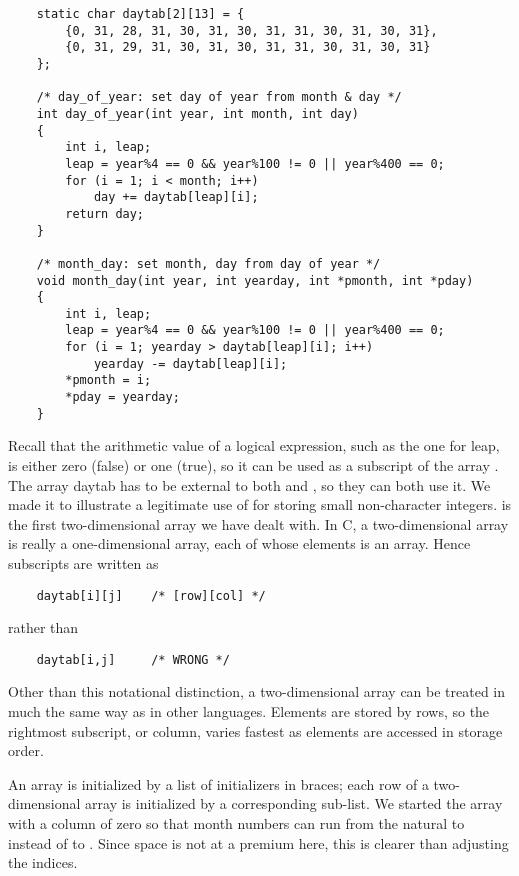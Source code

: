 \begin{lstlisting}
    static char daytab[2][13] = {
        {0, 31, 28, 31, 30, 31, 30, 31, 31, 30, 31, 30, 31},
        {0, 31, 29, 31, 30, 31, 30, 31, 31, 30, 31, 30, 31}
    };

    /* day_of_year: set day of year from month & day */
    int day_of_year(int year, int month, int day)
    {
        int i, leap;
        leap = year%4 == 0 && year%100 != 0 || year%400 == 0;
        for (i = 1; i < month; i++)
            day += daytab[leap][i];
        return day;
    }

    /* month_day: set month, day from day of year */
    void month_day(int year, int yearday, int *pmonth, int *pday)
    {
        int i, leap;
        leap = year%4 == 0 && year%100 != 0 || year%400 == 0;
        for (i = 1; yearday > daytab[leap][i]; i++)
            yearday -= daytab[leap][i];
        *pmonth = i;
        *pday = yearday;
    }
\end{lstlisting}

Recall that the arithmetic value of a logical expression, such as the one for leap, is either zero (false) or one (true), so it can be used as a subscript of the array .
The array daytab has to be external to both  and , so they can both use it.
We made it  to illustrate a legitimate use of  for storing small non-character integers.
 is the first two-dimensional array we have dealt with. In C, a two-dimensional array is really a one-dimensional array, each of whose elements is an array.
Hence subscripts are written as
\begin{lstlisting}
    daytab[i][j]    /* [row][col] */
\end{lstlisting}
rather than
\begin{lstlisting}
    daytab[i,j]     /* WRONG */
\end{lstlisting}
Other than this notational distinction, a two-dimensional array can be treated in much the same way as in other languages.
Elements are stored by rows, so the rightmost subscript, or column, varies fastest as elements are accessed in storage order.

An array is initialized by a list of initializers in braces; each row of a two-dimensional array is initialized by a corresponding sub-list.
We started the array  with a column of zero so that month numbers can run from the natural  to  instead of  to .
Since space is not at a premium here, this is clearer than adjusting the indices.

